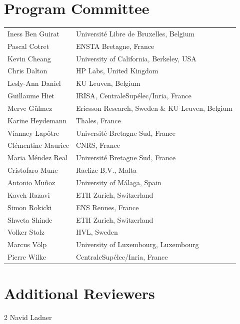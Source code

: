 \documentclass[runningheads]{llncs}
\begin{document}
\section*{Program Committee}
\begin{longtable}{p{}p{}}
Iness Ben Guirat     & Universit\'e Libre de Bruxelles, Belgium \\
Pascal Cotret        & ENSTA Bretagne, France \\
Kevin Cheang         & University of California, Berkeley, USA  \\
Chris Dalton         & HP Labs, United Kingdom \\
Lesly-Ann Daniel     & KU Leuven, Belgium \\
Guillaume Hiet       & IRISA, CentraleSup\'elec/Inria, France \\
Merve G\"ulmez       & Ericsson Research, Sweden \& KU Leuven, Belgium \\
Karine Heydemann     & Thales, France \\
Vianney Lap\^otre    & Universit\'e Bretagne Sud, France \\
Cl\'ementine Maurice & CNRS, France \\
Maria M\'endez Real  & Universit\'e Bretagne Sud, France \\
Cristofaro Mune      & Raelize B.V., Malta \\
Antonio Mu\~noz      & University of M\'alaga, Spain \\
Kaveh Razavi         & ETH Zurich, Switzerland \\
Simon Rokicki        & ENS Rennes, France \\
Shweta Shinde        & ETH Zurich, Switzerland \\
Volker Stolz         & HVL, Sweden \\
Marcus V\"olp        & University of  Luxembourg, Luxembourg \\
Pierre Wilke         & CentraleSup\'elec/Inria, France \\
\end{longtable}

\section*{Additional Reviewers}
\begin{multicols}{2}
\noindent Navid Ladner \\
\end{multicols}

\tableofcontents
\end{document}
